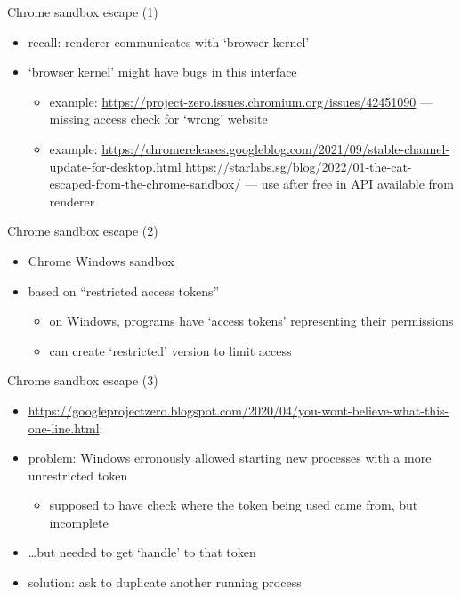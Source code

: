 \begin{frame}{Chrome sandbox escape (1)}
    \begin{itemize}
    \item recall: renderer communicates with `browser kernel'
    \item `browser kernel' might have bugs in this interface
        \begin{itemize}
        \item example: \url{https://project-zero.issues.chromium.org/issues/42451090} --- missing access check for `wrong' website
        \item example: \url{https://chromereleases.googleblog.com/2021/09/stable-channel-update-for-desktop.html} \url{https://starlabs.sg/blog/2022/01-the-cat-escaped-from-the-chrome-sandbox/} --- use after free in API available from renderer
        \end{itemize}
    \end{itemize}
\end{frame}

\begin{frame}{Chrome sandbox escape (2)}
    \begin{itemize}
    \item Chrome Windows sandbox
    \item based on ``restricted access tokens''
        \begin{itemize}
        \item on Windows, programs have `access tokens' representing their permissions
        \item can create `restricted' version to limit access
        \end{itemize}
    \end{itemize}
\end{frame}
\begin{frame}{Chrome sandbox escape (3)}
    \begin{itemize}
    \item {\tiny \url{https://googleprojectzero.blogspot.com/2020/04/you-wont-believe-what-this-one-line.html}}:
    \item problem: Windows erronously allowed starting new processes with a more unrestricted token
        \begin{itemize}
        \item supposed to have check where the token being used came from, but incomplete
        \end{itemize}
    \item \ldots but needed to get `handle' to that token
    \item solution: ask to duplicate another running process
    \end{itemize}
\end{frame}
